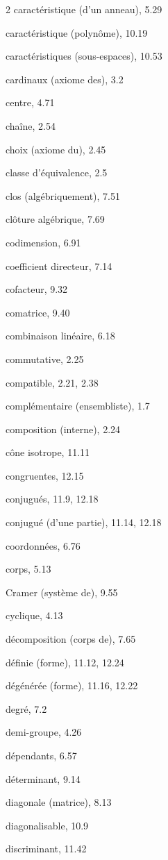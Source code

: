 \begin{multicols}{2}
caractéristique (d'un anneau), 5.29

caractéristique (polynôme), 10.19

caractéristiques (sous-espaces), 10.53

cardinaux (axiome des), 3.2


centre, 4.71

chaîne, 2.54

choix (axiome du), 2.45

classe d'équivalence, 2.5

clos (algébriquement), 7.51

clôture algébrique, 7.69

codimension, 6.91

coefficient directeur, 7.14

cofacteur, 9.32

comatrice, 9.40

combinaison linéaire, 6.18

commutative, 2.25

compatible, 2.21, 2.38

complémentaire (ensembliste), 1.7

composition (interne), 2.24

cône isotrope, 11.11

congruentes, 12.15

conjugués, 11.9, 12.18

conjugué (d'une partie), 11.14, 12.18

coordonnées, 6.76

corps, 5.13

Cramer (système de), 9.55

\medskip
cyclique, 4.13

\medskip
décomposition (corps de), 7.65

définie (forme), 11.12, 12.24

dégénérée (forme), 11.16, 12.22

degré, 7.2

demi-groupe, 4.26

dépendants, 6.57

déterminant, 9.14

diagonale (matrice), 8.13

diagonalisable, 10.9

discriminant, 11.42


\end{multicols}
